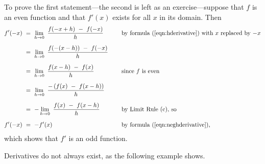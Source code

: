 To prove the first statement---the second is left as an exercise---suppose that $f$ is
an even function and that $f'(x)$ exists for all $x$ in its domain. Then
\begin{alignat*}{3}
 f'(-x) ~&=~ \lim_{h \to 0} ~\frac{f(-x + h) ~-~ f(-x)}{h} \qquad&&\text{by
  formula (\ref{eqn:hderivative}) with $x$ replaced by $-x$}\\[6pt]
 &=~ \lim_{h \to 0} ~\frac{f(-(x - h)) ~-~ f(-x)}{h} &&{}\\[6pt]
 &=~ \lim_{h \to 0} ~\frac{f(x - h) ~-~ f(x)}{h}
  &&\text{since $f$ is even}\\[6pt]
 &=~ \lim_{h \to 0} ~\frac{-\left(f(x) ~-~ f(x-h)\right)}{h} &&{}\\[6pt]
 &=~ -\lim_{h \to 0} ~\frac{f(x) ~-~ f(x-h)}{h}
  &&\text{by Limit Rule (c), so}\\[6pt]
 f'(-x) ~&=~ -f'(x) &&\text{by formula (\ref{eqn:neghderivative}),}
\end{alignat*}
which shows that $f'$ is an odd function.

Derivatives do not always exist, as the following example shows.

